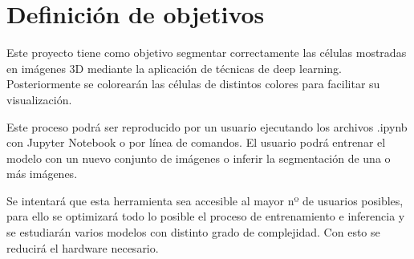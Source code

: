 \chapter{Definici\'on de objetivos}\label{defobjetivos}

Este proyecto tiene como objetivo segmentar correctamente las células mostradas en imágenes 3D mediante la aplicación de técnicas de deep learning. Posteriormente se colorearán las células de distintos colores para facilitar su visualización. 

Este proceso podrá ser reproducido por un usuario ejecutando los archivos .ipynb con Jupyter Notebook o por línea de comandos. El usuario podrá entrenar el modelo con un nuevo conjunto de imágenes o inferir la segmentación de una o más imágenes.

Se intentará que esta herramienta sea accesible al mayor nº de usuarios posibles, para ello se optimizará todo lo posible el proceso de entrenamiento e inferencia y se estudiarán varios modelos con distinto grado de complejidad. Con esto se reducirá el hardware necesario.